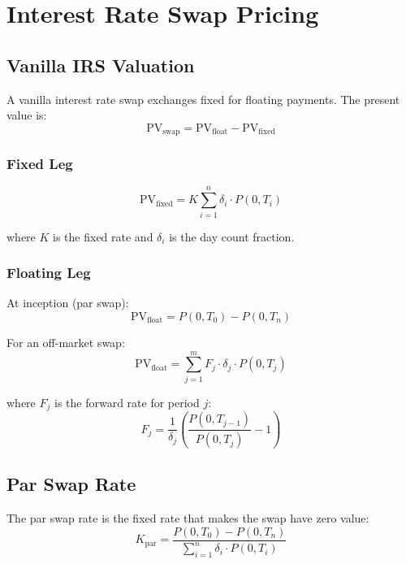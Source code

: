 \documentclass[12pt,a4paper]{report}
\newcommand{\pv}{\text{PV}}
\begin{document}
\section{Interest Rate Swap Pricing}

\subsection{Vanilla IRS Valuation}

A vanilla interest rate swap exchanges fixed for floating payments. The present value is:
\begin{equation}
    \pv_{\text{swap}} = \pv_{\text{float}} - \pv_{\text{fixed}}
\end{equation}

\subsubsection{Fixed Leg}

\begin{equation}
    \pv_{\text{fixed}} = K \sum_{i=1}^{n} \delta_i \cdot P(0,T_i)
\end{equation}

where $K$ is the fixed rate and $\delta_i$ is the day count fraction.

\subsubsection{Floating Leg}

At inception (par swap):
\begin{equation}
    \pv_{\text{float}} = P(0,T_0) - P(0,T_n)
\end{equation}

For an off-market swap:
\begin{equation}
    \pv_{\text{float}} = \sum_{j=1}^{m} F_j \cdot \delta_j \cdot P(0,T_j)
\end{equation}

where $F_j$ is the forward rate for period $j$:
\begin{equation}
    F_j = \frac{1}{\delta_j} \left( \frac{P(0,T_{j-1})}{P(0,T_j)} - 1 \right)
\end{equation}

\subsection{Par Swap Rate}

The par swap rate is the fixed rate that makes the swap have zero value:
\begin{equation}
    K_{\text{par}} = \frac{P(0,T_0) - P(0,T_n)}{\sum_{i=1}^{n} \delta_i \cdot P(0,T_i)}
\end{equation}
\end{document}

